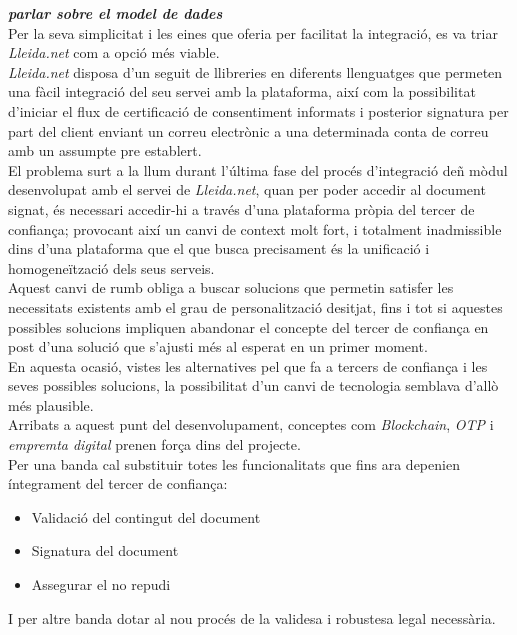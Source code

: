 \newline \textit{\textbf{parlar sobre el model de dades}}\\
\newline Per la seva simplicitat i les eines que oferia per facilitat la integració, es va triar \textit{Lleida.net} com a opció més viable.\\
\textit{Lleida.net} disposa d'un seguit de llibreries en diferents llenguatges que permeten una fàcil integració del seu servei amb la plataforma, així com la possibilitat d'iniciar el flux de certificació de consentiment informats i posterior signatura per part del client enviant un correu electrònic a una determinada conta de correu amb un assumpte pre establert.\\
\newline El problema surt a la llum durant l'última fase del procés d'integració deñ mòdul desenvolupat amb el servei de \textit{Lleida.net}, quan per poder accedir al document signat, és necessari accedir-hi a través d'una plataforma pròpia del tercer de confiança; provocant així un canvi de context molt fort, i totalment inadmissible dins d'una plataforma que el que busca precisament és la unificació i homogeneïtzació dels seus serveis.\\
\newline Aquest canvi de rumb obliga a buscar solucions que permetin satisfer les necessitats existents amb el grau de personalització desitjat, fins i tot si aquestes possibles solucions impliquen abandonar el concepte del tercer de confiança en post d'una solució que s'ajusti més al esperat en un primer moment.\\
En aquesta ocasió, vistes les alternatives pel que fa a tercers de confiança i les seves possibles solucions, la possibilitat d'un canvi de tecnologia semblava d'allò més plausible.\\
Arribats a aquest punt del desenvolupament, conceptes com \textit{Blockchain}, \textit{OTP} i \textit{empremta digital} prenen força dins del projecte.\\
\newline Per una banda cal substituir totes les funcionalitats que fins ara depenien íntegrament del tercer de confiança:
\begin{itemize}
    \item Validació del contingut del document
    \item Signatura del document
    \item Assegurar el no repudi 
\end{itemize}
I per altre banda dotar al nou procés de la validesa i robustesa legal necessària.\\

